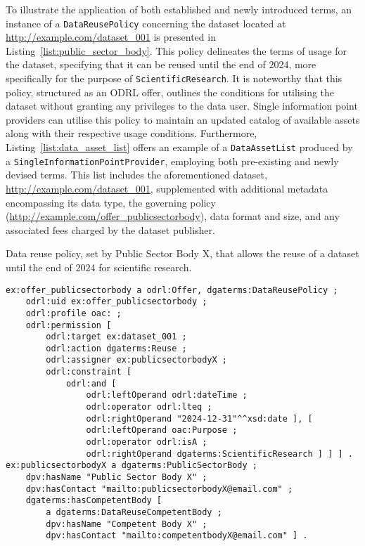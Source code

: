 To illustrate the application of both established and newly introduced terms, an instance of a \texttt{DataReusePolicy} concerning the dataset located at \url{http://example.com/dataset_001} is presented in Listing~\ref{list:public_sector_body}.
This policy delineates the terms of usage for the dataset, specifying that it can be reused until the end of 2024, more specifically for the purpose of \texttt{ScientificResearch}.
It is noteworthy that this policy, structured as an ODRL offer, outlines the conditions for utilising the dataset without granting any privileges to the data user.
Single information point providers can utilise this policy to maintain an updated catalog of available assets along with their respective usage conditions.
Furthermore, Listing~\ref{list:data_asset_list} offers an example of a \texttt{DataAssetList} produced by a \texttt{SingleInformationPointProvider}, employing both pre-existing and newly devised terms.
This list includes the aforementioned dataset, \url{http://example.com/dataset_001}, supplemented with additional metadata encompassing its data type, the governing policy (\url{http://example.com/offer_publicsectorbody}), data format and size, and any associated fees charged by the dataset publisher.

\begin{listing}[ht]
\caption[Public sector body data reuse policy.]{Data reuse policy, set by Public Sector Body X, that allows the reuse of a dataset until the end of 2024 for scientific research.}
\label{list:public_sector_body}
\begin{verbatim}
ex:offer_publicsectorbody a odrl:Offer, dgaterms:DataReusePolicy ;
    odrl:uid ex:offer_publicsectorbody ;
    odrl:profile oac: ;
    odrl:permission [
        odrl:target ex:dataset_001 ;
        odrl:action dgaterms:Reuse ;
        odrl:assigner ex:publicsectorbodyX ;
        odrl:constraint [
            odrl:and [
                odrl:leftOperand odrl:dateTime ;
                odrl:operator odrl:lteq ;
                odrl:rightOperand "2024-12-31"^^xsd:date ], [
                odrl:leftOperand oac:Purpose ;
                odrl:operator odrl:isA ;
                odrl:rightOperand dgaterms:ScientificResearch ] ] ] .
ex:publicsectorbodyX a dgaterms:PublicSectorBody ;
    dpv:hasName "Public Sector Body X" ;
    dpv:hasContact "mailto:publicsectorbodyX@email.com" ;
    dgaterms:hasCompetentBody [
        a dgaterms:DataReuseCompetentBody ;
        dpv:hasName "Competent Body X" ;
        dpv:hasContact "mailto:competentbodyX@email.com" ] .
\end{verbatim}
\end{listing}

